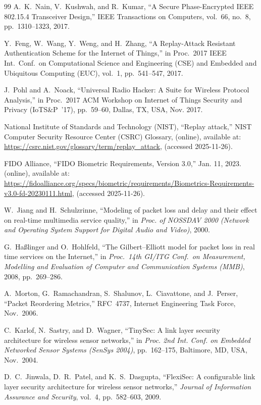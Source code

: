\documentclass[twocolumn,10pt,a4paper]{jsarticle}
\begin{document}
\begin{thebibliography}{99}
A.~K.~Nain, V.~Kushwah, and R.~Kumar,
``A Secure Phase-Encrypted IEEE 802.15.4 Transceiver Design,''
IEEE Transactions on Computers, vol.~66, no.~8, pp.~1310--1323, 2017.

Y.~Feng, W.~Wang, Y.~Weng, and H.~Zhang,
``A Replay-Attack Resistant Authentication Scheme for the Internet of Things,''
in Proc.\ 2017 IEEE Int.\ Conf.\ on Computational Science and Engineering (CSE)
and Embedded and Ubiquitous Computing (EUC), vol.~1, pp.~541--547, 2017.

J.~Pohl and A.~Noack,
``Universal Radio Hacker: A Suite for Wireless Protocol Analysis,''
in Proc.\ 2017 ACM Workshop on Internet of Things Security and Privacy (IoTS\&P~'17),
pp.~59--60, Dallas, TX, USA, Nov. 2017.

National Institute of Standards and Technology (NIST),
``Replay attack,''
NIST Computer Security Resource Center (CSRC) Glossary,
(online), available at:
\url{https://csrc.nist.gov/glossary/term/replay_attack},
(accessed 2025-11-26).

FIDO Alliance,
``FIDO Biometric Requirements, Version 3.0,''
Jan. 11, 2023.
(online), available at:
\url{https://fidoalliance.org/specs/biometric/requirements/Biometrics-Requirements-v3.0-fd-20230111.html},
(accessed 2025-11-26).

W.~Jiang and H.~Schulzrinne,
``Modeling of packet loss and delay and their effect on real-time multimedia service quality,''
in \textit{Proc. of NOSSDAV 2000 (Network and Operating System Support for Digital Audio and Video)},
2000.

G.~Ha\ss linger and O.~Hohlfeld,
``The Gilbert--Elliott model for packet loss in real time services on the Internet,''
in \textit{Proc.\ 14th GI/ITG Conf.\ on Measurement, Modelling and Evaluation of Computer and Communication Systems (MMB)},
2008, pp.~269--286.

A.~Morton, G.~Ramachandran, S.~Shalunov, L.~Ciavattone, and J.~Perser,
``Packet Reordering Metrics,''
RFC~4737, Internet Engineering Task Force, Nov.\ 2006.

C.~Karlof, N.~Sastry, and D.~Wagner,
``TinySec: A link layer security architecture for wireless sensor networks,''
in \textit{Proc. 2nd Int. Conf. on Embedded Networked Sensor Systems (SenSys 2004)},
pp.~162--175, Baltimore, MD, USA, Nov.\ 2004.

D.~C.~Jinwala, D.~R.~Patel, and K.~S.~Dasgupta,
``FlexiSec: A configurable link layer security architecture for wireless sensor networks,''
\textit{Journal of Information Assurance and Security},
vol.~4, pp.~582--603, 2009.


\end{thebibliography}
\end{document}
